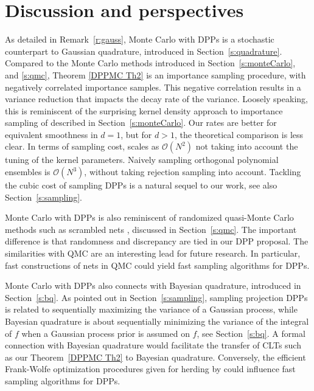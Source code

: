 \documentclass[a4paper,11pt]{article}
\numberwithin{equation}{section}
\theoremstyle{definition}
\newcommand{\cO}{\mathcal{O}}
\begin{document}
\section{Discussion and perspectives}
\label{s:discussion}
As detailed in Remark~\ref{r:gauss}, Monte Carlo with DPPs is a stochastic
counterpart to Gaussian quadrature, introduced in Section~\ref{s:quadrature}.
Compared to the Monte Carlo methods introduced in Section~\ref{s:monteCarlo}, and
\ref{s:qmc}, Theorem \ref{DPPMC Th2} is an importance sampling procedure, with negatively
correlated importance samples. This negative correlation results in a variance
reduction that impacts the decay rate of the variance. Loosely speaking, this is
reminiscent of the surprising kernel density approach to importance sampling of
\cite{DePo16} described in Section~\ref{s:monteCarlo}. Our rates are better for
equivalent smoothness in $d=1$, but for $d>1$, the theoretical comparison is less clear. In terms of sampling cost, \citep{DePo16} scales as $\cO(N^2)$ not taking into account the tuning of the kernel parameters. Naively sampling orthogonal polynomial ensembles is $\cO(N^3)$, without taking rejection sampling into account. Tackling the cubic cost of sampling DPPs is a natural sequel to our work, see also Section~\ref{s:sampling}.


Monte Carlo with DPPs is also reminiscent of randomized quasi-Monte
Carlo methods such as scrambled nets \citep{Owe97}, discussed in Section~\ref{s:qmc}. The important difference is that randomness and discrepancy are tied in our DPP proposal. The similarities with QMC are an interesting lead for future research. In particular, fast constructions of nets in QMC \citep{DiKuSl13} could yield fast sampling algorithms for DPPs.

Monte Carlo with DPPs also connects with Bayesian quadrature, introduced in
Section~\ref{s:bq}. As pointed out in Section~\ref{s:sampling}, sampling
projection DPPs is related to sequentially maximizing the variance of a Gaussian process,
while Bayesian quadrature is about sequentially minimizing the variance of the
integral of $f$ when a Gaussian process prior is assumed on $f$, see
Section~\ref{s:bq}. A formal connection with Bayesian quadrature would
facilitate the transfer of CLTs such as our Theorem~\ref{DPPMC Th2} to
Bayesian quadrature. Conversely, the efficient Frank-Wolfe optimization procedures
given for herding by \cite{BaLaOb12,BOGOS15} could influence fast sampling algorithms for DPPs.
\end{document}
